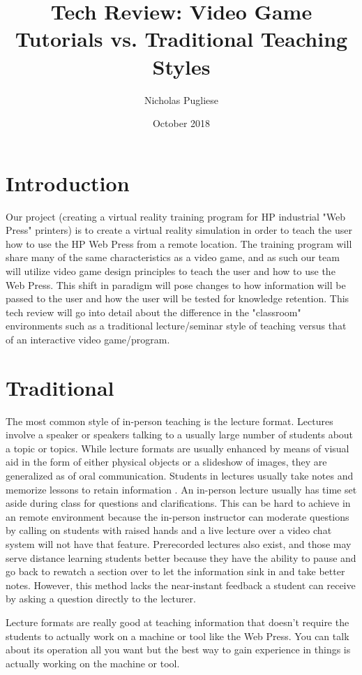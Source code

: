 \documentclass[onecolumn, draftclsnofoot,10pt, compsoc]{IEEEtran}
\title{Tech Review: Video Game Tutorials vs. Traditional Teaching Styles}
\author{Nicholas Pugliese}
\date{October 2018}
\begin{document}
\setlength\parindent{0pt}
\maketitle

\section*{Introduction}
Our project (creating a virtual reality training program for HP industrial "Web Press" printers) is to create a virtual reality simulation in order to teach the user how to use the HP Web Press from a remote location. The training program will share many of the same characteristics as a video game, and as such our team will utilize video game design principles to teach the user and how to use the Web Press. This shift in paradigm will pose changes to how information will be passed to the user and how the user will be tested for knowledge retention. This tech review will go into detail about the difference in the "classroom" environments such as a traditional lecture/seminar style of teaching versus that of an interactive video game/program.

\section*{Traditional}
The most common style of in-person teaching is the lecture format. Lectures involve a speaker or speakers talking to a usually large number of students about a topic or topics. While lecture formats are usually enhanced by means of visual aid in the form of either physical objects or a slideshow of images, they are generalized as of oral communication. Students in lectures usually take notes and memorize lessons to retain information \cite{lecture}. An in-person lecture usually has time set aside during class for questions and clarifications. This can be hard to achieve in an remote environment because the in-person instructor can moderate questions by calling on students with raised hands and a live lecture over a video chat system will not have that feature. Prerecorded lectures also exist, and those may serve distance learning students better because they have the ability to pause and go back to rewatch a section over to let the information sink in and take better notes. However, this method lacks the near-instant feedback a student can receive by asking a question directly to the lecturer.

Lecture formats are really good at teaching information that doesn't require the students to actually work on a machine or tool like the Web Press. You can talk about its operation all you want but the best way to gain experience in things is actually working on the machine or tool.
\end{document}
